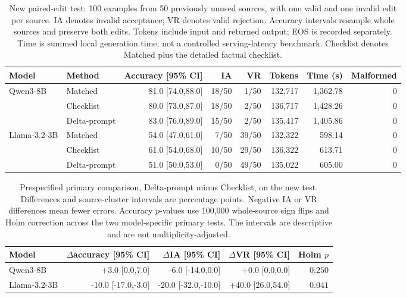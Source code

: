 \documentclass[10pt,letterpaper,twocolumn]{article}
\begin{document}
\begin{table}[t]
\centering\small
\setlength{\tabcolsep}{4pt}
\begin{tabular}{llrrrrrr}
\toprule
Model & Method & Accuracy [95\% CI] & IA & VR & Tokens & Time (s) & Malformed\\
\midrule
Qwen3-8B & Matched & 81.0 [74.0,88.0] & 18/50 & 1/50 & 132,717 & 1,362.78 & 0\\
 & Checklist & 80.0 [73.0,87.0] & 18/50 & 2/50 & 136,717 & 1,428.26 & 0\\
 & Delta-prompt & 83.0 [76.0,89.0] & 15/50 & 2/50 & 135,417 & 1,405.86 & 0\\
\midrule
Llama-3.2-3B & Matched & 54.0 [47.0,61.0] & 7/50 & 39/50 & 132,322 & 598.14 & 0\\
 & Checklist & 61.0 [54.0,68.0] & 10/50 & 29/50 & 136,322 & 613.71 & 0\\
 & Delta-prompt & 51.0 [50.0,53.0] & 0/50 & 49/50 & 135,022 & 605.00 & 0\\
\bottomrule
\end{tabular}
\caption{New paired-edit test: 100 examples from 50 previously unused sources, with one valid and one invalid edit per source. IA denotes invalid acceptance; VR denotes valid rejection. Accuracy intervals resample whole sources and preserve both edits. Tokens include input and returned output; EOS is recorded separately. Time is summed local generation time, not a controlled serving-latency benchmark. Checklist denotes Matched plus the detailed factual checklist.}
\label{tab:replication-test}
\end{table}

\begin{table}[t]
\centering\small
\setlength{\tabcolsep}{4pt}
\begin{tabular}{lrrrr}
\toprule
Model & $\Delta$accuracy [95\% CI] & $\Delta$IA [95\% CI] & $\Delta$VR [95\% CI] & Holm $p$\\
\midrule
Qwen3-8B & +3.0 [0.0,7.0] & -6.0 [-14.0,0.0] & +0.0 [0.0,0.0] & $0.250$\\
Llama-3.2-3B & -10.0 [-17.0,-3.0] & -20.0 [-32.0,-10.0] & +40.0 [26.0,54.0] & $0.041$\\
\bottomrule
\end{tabular}
\caption{Prespecified primary comparison, Delta-prompt minus Checklist, on the new test. Differences and source-cluster intervals are percentage points. Negative IA or VR differences mean fewer errors. Accuracy $p$-values use 100,000 whole-source sign flips and Holm correction across the two model-specific primary tests. The intervals are descriptive and are not multiplicity-adjusted.}
\label{tab:replication-paired}
\end{table}
\end{document}
